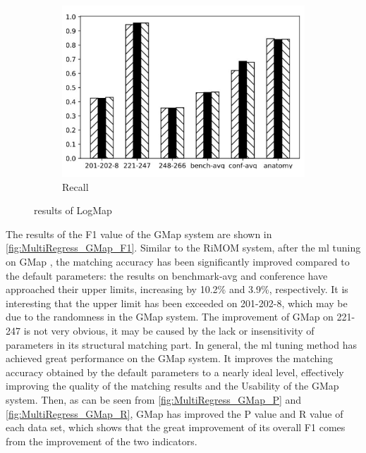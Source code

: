 \documentclass[twoside]{article}
\begin{document}
\begin{figure}[htb!]
\begin{subfigure}{0.3\textwidth}
\label{fig:MultiRegress_LogMap_P}
\end{subfigure}
\begin{subfigure}{0.3\textwidth}
	\centering
\includegraphics[width=\textwidth]{data_figs/MulRegress_LogMap_R.pdf}
\caption{Recall}
\label{fig:MultiRegress_LogMap_R}
\end{subfigure}
\caption{results of LogMap}
\end{figure}

The results of the F1 value of the GMap system are shown in \ref{fig:MultiRegress_GMap_F1}.
Similar to the RiMOM system, after the ml tuning on GMap , the matching accuracy has been significantly improved compared to the default parameters: the results on benchmark-avg and conference have approached their upper limits, increasing by 10.2\% and 3.9\%, respectively.
It is interesting that the upper limit has been exceeded on 201-202-8, which may be due to the randomness in the GMap system.
The improvement of GMap on 221-247 is not very obvious, it may be caused by the lack or insensitivity of parameters in its structural matching part.
In general, the ml tuning method has achieved great performance on the GMap system. It improves the matching accuracy obtained by the default parameters to a nearly ideal level, effectively improving the quality of the matching results and the Usability of the GMap system.
Then, as can be seen from \ref{fig:MultiRegress_GMap_P} and \ref{fig:MultiRegress_GMap_R}, GMap has improved the P value and R value of each data set, which shows that the great improvement of its overall F1 comes from the improvement of the two indicators.
\end{document}
